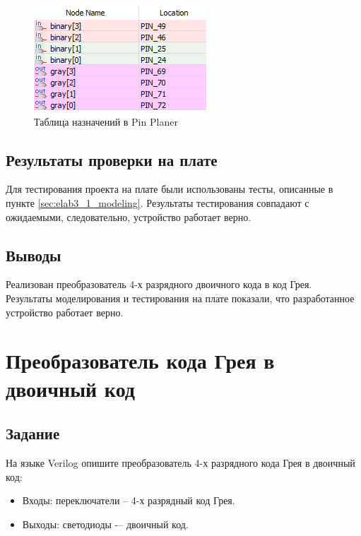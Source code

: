 \begin{figure}[H]
\begin{center}
	\includegraphics{elab3_1_pins}
	\caption{Таблица назначений в Pin Planer}
	\label{fig:elab3_1_pins}
\end{center}
\end{figure}

\subsection{Результаты проверки на плате}

Для тестирования проекта на плате были использованы тесты, описанные в пункте \ref{sec:elab3_1_modeling}. Результаты тестирования совпадают с ожидаемыми, следовательно, устройство работает верно.

\subsection{Выводы}

Реализован преобразователь 4-х разрядного двоичного кода в код Грея. Результаты моделирования и тестирования на плате показали, что разработанное устройство работает верно.

\section{Преобразователь кода Грея в двоичный код}

\subsection{Задание}

На языке Verilog опишите преобразователь 4-х разрядного кода Грея в двоичный код:
\begin{itemize}
	\item Входы: переключатели  -- 4-х разрядный код Грея.
	\item Выходы: светодиоды  -– двоичный код.
\end{itemize}

